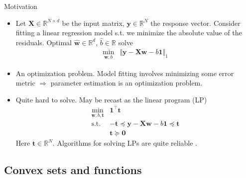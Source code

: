 \documentclass{beamer}
\numberwithin{equation}{section}
\begin{document}
\begin{frame}{Motivation}
    \begin{itemize}
        \item
        Let $ \mathbf{X} \in \mathbb{R}^{N \times d} $ be the input matrix,
        $ \mathbf{y} \in \mathbb{R}^N $ the response vector. Consider
        fitting a linear regression model s.t. we minimize the
        absolute value of the residuals. Optimal $ \hat{\mathbf{w}} \in
        \mathbb{R}^d $, $ \hat{b} \in \mathbb{R} $ solve
        \begin{equation*}
            \begin{array}{ll}
                \displaystyle\min_{\mathbf{w}, b} &
                    \Vert\mathbf{y} - \mathbf{Xw} - b\mathbf{1}\Vert_1
            \end{array}
        \end{equation*}

        \item
        An optimization problem. Model fitting involves minimizing some
        error metric $ \Rightarrow $ parameter estimation is an optimization
        problem.

        \item
        Quite hard to solve. May be recast as the linear program (LP)
        \cite{bv_convex_opt}
        \begin{equation*}
            \begin{array}{ll}
                \displaystyle\min_{\mathbf{w}, b, \mathbf{t}} &
                    \mathbf{1}^\top\mathbf{t} \\
                \text{s.t.} &
                    -\mathbf{t} \preceq \mathbf{y} - \mathbf{Xw} - b\mathbf{1}
                    \preceq \mathbf{t} \\
                & \mathbf{t} \succeq \mathbf{0}
            \end{array}
        \end{equation*}
        Here $ \mathbf{t} \in \mathbb{R}^N $. Algorithms for solving LPs
        are quite reliable \cite{bv_convex_opt}.
    \end{itemize}
\end{frame}

\subsection{Convex sets and functions}
\end{document}
